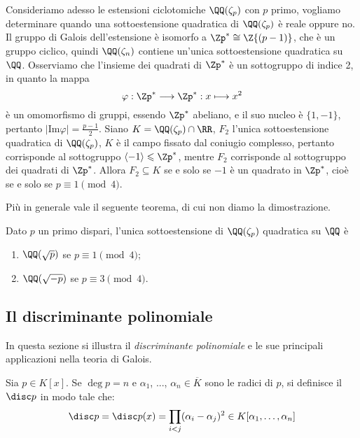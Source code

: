 \documentclass[11pt]{scrartcl}
\begin{document}
	Consideriamo adesso le estensioni ciclotomiche $\QQ(\zeta_p)$ con $p$ primo,
	vogliamo determinare quando una sottoestensione quadratica di $\QQ(\zeta_p)$
	è reale oppure no. Il gruppo di Galois dell'estensione è isomorfo a $\Zp^* \cong 
	\Z{(p -1)}$, che è un gruppo ciclico, quindi $\QQ(\zeta_n)$ contiene un'unica 
	sottoestensione quadratica su $\QQ$. Osserviamo che l'insieme dei quadrati 
	di $\Zp^*$ è un sottogruppo di indice 2, in quanto la mappa 
	\[
	\varphi: \Zp^* \longrightarrow \Zp^*: x \longmapsto x^2
	\]
	è un omomorfismo di gruppi, essendo $\Zp^*$ abeliano, e il suo nucleo è $\{1, -1\}$,
	pertanto $|\mathrm{Im}\varphi| = \displaystyle\frac{p - 1}{2}$. Siano $K = \QQ(\zeta_p)\cap \RR$,
	$F_2$ l'unica sottoestensione quadratica di $\QQ(\zeta_p)$, $K$ è il campo 
	fissato dal coniugio complesso, pertanto corrisponde al sottogruppo
	$\langle -1\rangle \leqslant \Zp^*$, mentre $F_2$ corrisponde al sottogruppo
	dei quadrati di $\Zp^*$. Allora $F_2 \subseteq K$ se e solo se $-1$ è un 
	quadrato in $\Zp^*$, cioè se e solo se $p \equiv 1 \pmod 4$.
	
	Più in generale vale il seguente teorema, di cui non diamo la dimostrazione.
	
	\begin{theorem}
		Dato $p$ un primo dispari, l'unica sottoestensione di $\QQ(\zeta_p)$ 
		quadratica su $\QQ$ è
		\begin{enumerate}[(1)]
			\item $\QQ(\sqrt p)$ se $p \equiv 1 \pmod 4$;
			\item $\QQ(\sqrt{-p})$ se $p \equiv 3 \pmod 4$.
		\end{enumerate}
	\end{theorem}   
	
	\newpage
	\subsection{Il discriminante polinomiale}
	In questa sezione si illustra il \textit{discriminante polinomiale} e
	le sue principali applicazioni nella teoria di Galois.
	
	\begin{definition}
		Sia $p \in K[x]$. Se $\deg p = n$ e $\alpha_1$, ..., $\alpha_n \in \overline{K}$ sono le radici
		di $p$, si definisce il  $\disc p$ in modo
		tale che:
		\[ \disc p = \disc p(x) = \prod_{i < j} (\alpha_i - \alpha_j)^2 \in K[\alpha_1, \ldots, \alpha_n] \]
	\end{definition}
	
\end{document}
